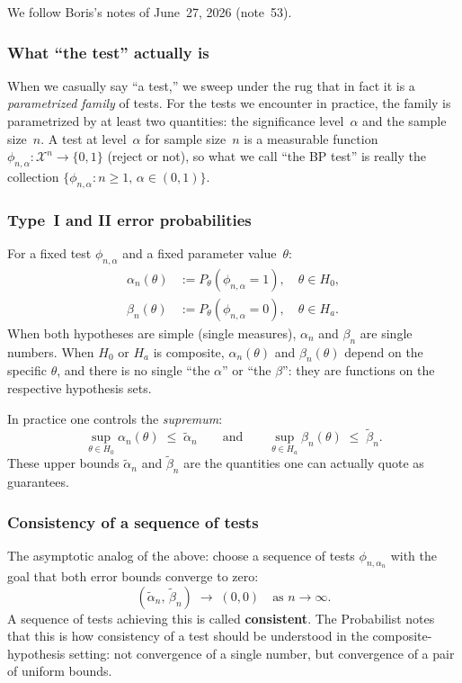 \documentclass[a4paper,oneside,12pt]{extarticle}
\theoremstyle{plain}
\theoremstyle{definition}
\theoremstyle{remark}
\begin{document}
We follow Boris's notes of June~27, 2026 (note~53).

\subsubsection*{What ``the test'' actually is}

When we casually say ``a test,'' we sweep under the rug that in fact
it is a \emph{parametrized family} of tests.  For the tests we
encounter in practice, the family is parametrized by at least two
quantities: the significance level~$\alpha$ and the sample size~$n$.
A test at level~$\alpha$ for sample size~$n$ is a measurable function
$\phi_{n,\alpha}\colon \mathcal{X}^n \to \{0,1\}$ (reject or not),
so what we call ``the BP test'' is really the collection
$\{\phi_{n,\alpha} : n \geq 1,\, \alpha \in (0,1)\}$.

\subsubsection*{Type~I and II error probabilities}

For a fixed test $\phi_{n,\alpha}$ and a fixed parameter
value~$\theta$:
\begin{align*}
  \alpha_n(\theta) &:= P_\theta(\phi_{n,\alpha} = 1),
  \quad \theta \in H_0, \\
  \beta_n(\theta) &:= P_\theta(\phi_{n,\alpha} = 0),
  \quad \theta \in H_a.
\end{align*}
When both hypotheses are simple (single measures), $\alpha_n$ and
$\beta_n$ are single numbers.  When $H_0$ or $H_a$ is composite,
$\alpha_n(\theta)$ and $\beta_n(\theta)$ depend on the specific
$\theta$, and there is no single ``the $\alpha$'' or ``the $\beta$'':
they are functions on the respective hypothesis sets.

In practice one controls the \emph{supremum}:
\[
  \sup_{\theta \in H_0} \alpha_n(\theta) \;\leq\; \tilde\alpha_n
  \qquad\text{and}\qquad
  \sup_{\theta \in H_a} \beta_n(\theta) \;\leq\; \tilde\beta_n.
\]
These upper bounds $\tilde\alpha_n$ and $\tilde\beta_n$ are the
quantities one can actually quote as guarantees.

\subsubsection*{Consistency of a sequence of tests}

The asymptotic analog of the above: choose a sequence of tests
$\phi_{n,\alpha_n}$ with the goal that both error bounds converge to
zero:
\[
  (\tilde\alpha_n,\, \tilde\beta_n) \;\to\; (0, 0)
  \quad\text{as } n \to \infty.
\]
A sequence of tests achieving this is called \textbf{consistent}.
The Probabilist notes that this is how consistency of a test should be
understood in the composite-hypothesis setting: not convergence of
a single number, but convergence of a pair of uniform bounds.
\end{document}

